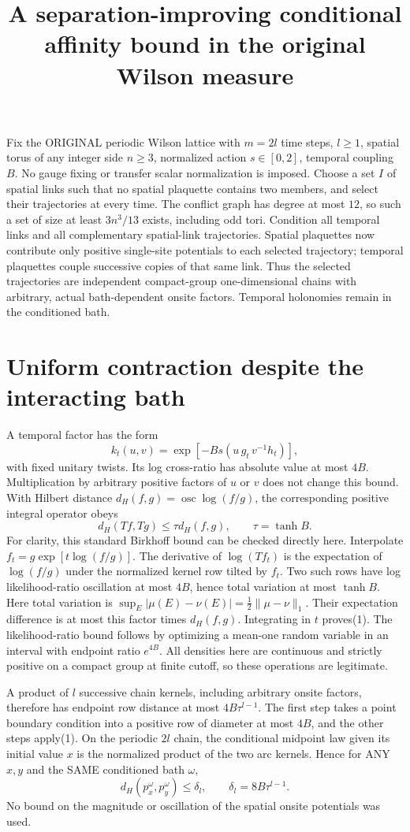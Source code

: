 \documentclass{article}
\title{A separation-improving conditional affinity bound in the original Wilson measure}\author{}\date{}
\begin{document}
\maketitle
Fix the ORIGINAL periodic Wilson lattice with $m=2l$ time steps, $l\ge1$, spatial torus of any integer side $n\ge3$, normalized action $s\in[0,2]$, temporal coupling $B$. No gauge fixing or transfer scalar normalization is imposed. Choose a set $I$ of spatial links such that no spatial plaquette contains two members, and select their trajectories at every time. The conflict graph has degree at most $12$, so such a set of size at least $3n^3/13$ exists, including odd tori. Condition all temporal links and all complementary spatial-link trajectories. Spatial plaquettes now contribute only positive single-site potentials to each selected trajectory; temporal plaquettes couple successive copies of that same link. Thus the selected trajectories are independent compact-group one-dimensional chains with arbitrary, actual bath-dependent onsite factors. Temporal holonomies remain in the conditioned bath.

\section*{Uniform contraction despite the interacting bath}
A temporal factor has the form
\[
 k_t(u,v)=\exp[-B s(u\,g_t\,v^{-1}h_t)],
\]
with fixed unitary twists. Its log cross-ratio has absolute value at most $4B$. Multiplication by arbitrary positive factors of $u$ or $v$ does not change this bound. With Hilbert distance $d_H(f,g)=\operatorname{osc}\log(f/g)$, the corresponding positive integral operator obeys
\[
 d_H(Tf,Tg)\le \tau d_H(f,g),\qquad \tau=\tanh B.       \tag{1}
\]
For clarity, this standard Birkhoff bound can be checked directly here. Interpolate $f_t=g\exp[t\log(f/g)]$. The derivative of $\log(Tf_t)$ is the expectation of $\log(f/g)$ under the normalized kernel row tilted by $f_t$. Two such rows have log likelihood-ratio oscillation at most $4B$, hence total variation at most $\tanh B$. Here total variation is $\sup_E|\mu(E)-\nu(E)|=\tfrac12\|\mu-\nu\|_1$. Their expectation difference is at most this factor times $d_H(f,g)$. Integrating in $t$ proves(1). The likelihood-ratio bound follows by optimizing a mean-one random variable in an interval with endpoint ratio $e^{4B}$. All densities here are continuous and strictly positive on a compact group at finite cutoff, so these operations are legitimate.

A product of $l$ successive chain kernels, including arbitrary onsite factors, therefore has endpoint row distance at most $4B\tau^{l-1}$. The first step takes a point boundary condition into a positive row of diameter at most $4B$, and the other steps apply(1). On the periodic $2l$ chain, the conditional midpoint law given its initial value $x$ is the normalized product of the two arc kernels. Hence for ANY $x,y$ and the SAME conditioned bath $\omega$,
\[
 d_H(p_x^\omega,p_y^\omega)\le \delta_l,
 \qquad \delta_l=8B\tau^{l-1}.                       \tag{2}
\]
No bound on the magnitude or oscillation of the spatial onsite potentials was used.
\end{document}
